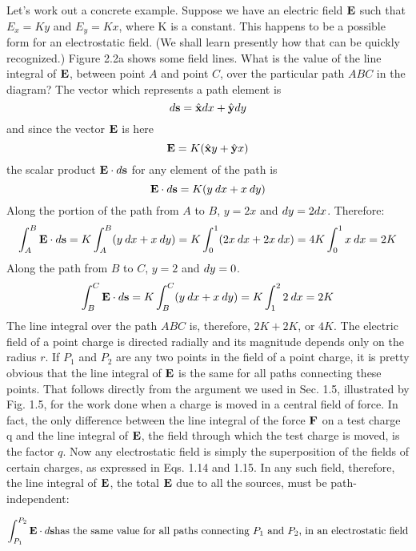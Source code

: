 Let's work out a concrete example. Suppose we have an electric
field $\mathbf{E}$ such that $E_x = Ky$ and $E_y = Kx$, where K is a constant. This
happens to be a possible form for an electrostatic field. (We shall
learn presently how that can be quickly recognized.) Figure 2.2a
shows some field lines. What is the value of the line integral of $\mathbf{E}$,
between point $A$ and point $C$, over the particular path $ABC$ in the
diagram? The vector which represents a path element is
\begin{equation}
  d \mathbf{s} = \hat{\mathbf{x}} d x + \hat{\mathbf{y}} d y
\end{equation}
and since the vector $\mathbf{E}$ is here
\begin{equation}
  \mathbf{E} = K(\hat{\mathbf{x}} y + \hat{\mathbf{y}} x)
\end{equation}
the scalar product $\mathbf{E}\cdot d\mathbf{s}$ for any element of the path is
\begin{equation}
  \mathbf{E}\cdot d\mathbf{s} = K(y\:d x + x\: d y)
\end{equation}
Along the portion of the path from $A$ to $B$, $y = 2x$ and $d y = 2 dx$.
Therefore:
\begin{equation}
  \int_A^B \mathbf{E}\cdot d\mathbf{s} = K\int_A^B  (y\:d x+x\:d y)
         = K\int_0^1(2x\:d x+2x\:d x)
         = 4K\int_0^1 x \:d x = 2K
\end{equation}
Along the path from $B$ to $C$, $y = 2$ and $d y = 0$.
\begin{equation}
  \int_B^C \mathbf{E}\cdot d\mathbf{s} = K \int_B^C(y\:d x+x\:d y) = K\int_1^22\:d x = 2K
\end{equation}
The line integral over the path $ABC$ is, therefore, $2K + 2K$, or $4K$.
The electric field of a point charge is directed radially and its magnitude
depends only on the radius $r$. If $P_1$ and $P_2$ are any two points
in the field of a point charge, it is pretty obvious that the line integral
of $\mathbf{E}$ is the same for all paths connecting these points. That follows
directly from the argument we used in Sec. 1.5, illustrated by Fig. 1.5,
for the work done when a charge is moved in a central field of force.
In fact, the only difference between the line integral of the force $\mathbf{F}$ on
a test charge q and the line integral of $\mathbf{E}$, the field through which the
test charge is moved, is the factor $q$. Now any electrostatic field is
simply the superposition of the fields of certain charges, as expressed
in Eqs. 1.14 and 1.15. In any such field, therefore, the line integral
of $\mathbf{E}$, the total $\mathbf{E}$ due to all the sources, must be path-independent:
\begin{framed}
\begin{equation}
  \int_{P_1}^{P_2} \mathbf{E}\cdot d\mathbf{s} \text{has the same value for all paths connecting
       $P_1$ and $P_2$, in an electrostatic field}
\end{equation}
\end{framed}

